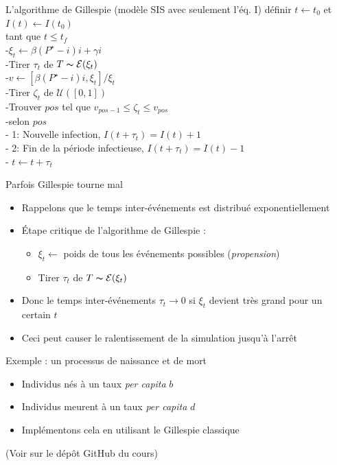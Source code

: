 \documentclass[aspectratio=169]{beamer}\usepackage[]{graphicx}\usepackage[]{xcolor}
\begin{document}
\begin{frame}{L'algorithme de Gillespie (modèle SIS avec seulement l'éq. I)}
définir $t\leftarrow t_0$ et $I(t)\leftarrow I(t_0)$\\
tant que {$t\leq t_f$}\\
-\qquad $\xi_t\leftarrow \beta (P^\star-i)i+\gamma i$\\
-\qquad Tirer $\tau_t$ de $T\thicksim \mathcal{E}(\xi_t)$\\
-\qquad $v\leftarrow\left[\beta (P^\star-i)i,\xi_t\right]/\xi_t$\\
-\qquad Tirer $\zeta_t$ de $\mathcal{U}([0,1])$\\
-\qquad Trouver $pos$ tel que $v_{pos-1}\leq\zeta_t\leq v_{pos}$\\
-\qquad selon {$pos$}\\
\qquad\qquad - 1: Nouvelle infection, $I(t+\tau_t)=I(t)+1$ \\
\qquad\qquad - 2: Fin de la période infectieuse, $I(t+\tau_t)=I(t)-1$ \\
- $t\leftarrow t+\tau_t$
\end{frame}


\begin{frame}{Parfois Gillespie tourne mal}
    \begin{itemize}
        \item Rappelons que le temps inter-événements est distribué exponentiellement
        \item Étape critique de l'algorithme de Gillespie :
        \begin{itemize}
            \item $\xi_t\leftarrow$ poids de tous les événements possibles (\emph{propension})
            \item Tirer $\tau_t$ de $T\thicksim \mathcal{E}(\xi_t)$
        \end{itemize}
        \item Donc le temps inter-événements $\tau_t\to 0$ si $\xi_t$ devient très grand pour un certain $t$
        \item Ceci peut causer le ralentissement de la simulation jusqu'à l'arrêt
    \end{itemize}
\end{frame}


\begin{frame}{Exemple : un processus de naissance et de mort}
    \begin{itemize}
        \item Individus nés à un taux \emph{per capita} $b$
        \item Individus meurent à un taux \emph{per capita} $d$
        \item Implémentons cela en utilisant le Gillespie classique
    \end{itemize}
    \vfill
(Voir \href{https://raw.githubusercontent.com/julien-arino/3MC-course-epidemiological-modelling/main/CODE/simulate_birth_death_CTMC.R}{} sur le dépôt GitHub du cours)
\end{frame}
\end{document}
